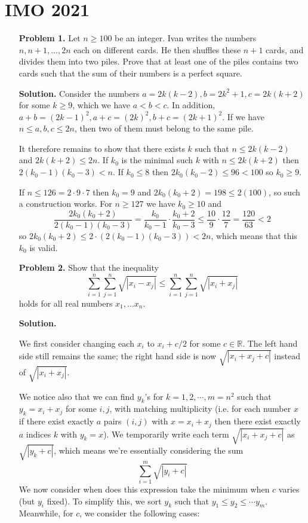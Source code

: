 \documentclass[11pt,a4paper]{article}
\newcommand{\bbR}{\mathbb R}
\newcommand{\<}{\langle}
\renewcommand{\>}{\rangle}
\newcommand{\dsum}{\displaystyle\sum}
\begin{document}
\newcommand{\sgn}{\text{sgn}}

\section*{IMO 2021}

\begin{enumerate}
	\item [\textbf{Problem 1.}] Let $n \geqslant 100$ be an integer. Ivan writes the numbers $n, n+1, \ldots, 2 n$ each on different cards. He then shuffles these $n+1$ cards, and divides them into two piles. Prove that at least one of the piles contains two cards such that the sum of their numbers is a perfect square.
	
	\textbf{Solution.} Consider the numbers $a=2k(k-2), b=2k^2+1, c=2k(k+2)$ for some $k\ge 9$, which we have $a<b<c$. In addition, $a+b=(2k-1)^2, a+c=(2k)^2, b+c=(2k+1)^2$. If we have $n\le a, b, c\le 2n$, then two of them must belong to the same pile. 
	
	It therefore remains to show that there exists $k$ such that $n\le 2k(k-2)$ and $2k(k+2)\le 2n$. If $k_0$ is the minimal such $k$ with $n\le 2k(k+2)$ then $2(k_0-1)(k_0-3)<n$. If $k_0\le 8$ then $2k_0(k_0-2)\le 96<100$ so $k_0\ge 9$. 
	
	If $n\le 126=2\cdot 9\cdot 7$ then $k_0=9$ and $2k_0(k_0+2)=198\le 2(100)$, so such a construction works. For $n\ge 127$ we have $k_0\ge 10$ and 
	\[
	\frac{2k_0(k_0+2)}{2(k_0-1)(k_0-3)}=\frac{k_0}{k_0-1}\cdot\frac{k_0+2}{k_0-3}\le \frac{10}{9}\cdot \frac{12}{7}=\frac{120}{63}<2
	\]
	so $2k_0(k_0+2)\le 2\cdot (2(k_0-1)(k_0-3)) < 2n$, which means that this $k_0$ is valid. 
	
	\item [\textbf{Problem 2.}] Show that the inequality \[\sum_{i=1}^n \sum_{j=1}^n \sqrt{|x_i-x_j|}\leqslant \sum_{i=1}^n \sum_{j=1}^n \sqrt{|x_i+x_j|}\]holds for all real numbers $x_1,\ldots x_n.$
	
	\textbf{Solution.} 
	
	We first consider changing each $x_i$ to $x_i+c/2$ for some $c\in\bbR$. The left hand side still remains the same; the right hand side is now $\sqrt{|x_i+x_j+c|}$ instead of $\sqrt{|x_i+x_j|}$. 
	
	We notice also that we can find $y_k$'s for $k=1, 2, \cdots, m=n^2$ such that $y_k=x_i+x_j$ for some $i, j$, with matching multiplicity (i.e. for each number $x$ if there exist exactly $a$ pairs $(i, j)$ with $x=x_i+x_j$ then there exist exactly $a$ indices $k$ with $y_k=x$). We temporarily write each term $\sqrt{|x_i+x_j+c|}$ as $\sqrt{|y_k+c|}$, which means we're essentially considering the sum 
	\[
	\dsum_{i=1}^m \sqrt{|y_i+c|}
	\]
	We now consider when does this expression take the minimum when $c$ varies (but $y_i$ fixed). To simplify this, we sort $y_k$ such that $y_1\le y_2\le \cdots y_m$. Meanwhile, for $c$, we consider the following cases: 
	

\end{enumerate}
\end{document}
